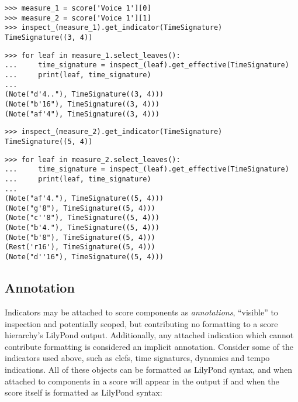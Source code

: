 \begin{abjadbookoutput}
\begin{singlespacing}
\vspace{-0.5\baselineskip}
\begin{lstlisting}
>>> measure_1 = score['Voice 1'][0]
>>> measure_2 = score['Voice 1'][1]
>>> inspect_(measure_1).get_indicator(TimeSignature)
TimeSignature((3, 4))
\end{lstlisting}
\begin{lstlisting}
>>> for leaf in measure_1.select_leaves():
...     time_signature = inspect_(leaf).get_effective(TimeSignature)
...     print(leaf, time_signature)
...
(Note("d'4.."), TimeSignature((3, 4)))
(Note("b'16"), TimeSignature((3, 4)))
(Note("af'4"), TimeSignature((3, 4)))
\end{lstlisting}
\begin{lstlisting}
>>> inspect_(measure_2).get_indicator(TimeSignature)
TimeSignature((5, 4))
\end{lstlisting}
\begin{lstlisting}
>>> for leaf in measure_2.select_leaves():
...     time_signature = inspect_(leaf).get_effective(TimeSignature)
...     print(leaf, time_signature)
...
(Note("af'4."), TimeSignature((5, 4)))
(Note("g'8"), TimeSignature((5, 4)))
(Note("c''8"), TimeSignature((5, 4)))
(Note("b'4."), TimeSignature((5, 4)))
(Note("b'8"), TimeSignature((5, 4)))
(Rest('r16'), TimeSignature((5, 4)))
(Note("d''16"), TimeSignature((5, 4)))
\end{lstlisting}
\end{singlespacing}
\end{abjadbookoutput}

\subsection{Annotation}

Indicators may be attached to score components as \emph{annotations},
\enquote{visible} to inspection and potentially scoped, but contributing no
formatting to a score hierarchy's LilyPond output. Additionally, any attached
indication which cannot contribute formatting is considered an implicit
annotation. Consider some of the indicators used above, such as clefs, time
signatures, dynamics and tempo indications. All of these objects can be
formatted as LilyPond syntax, and when attached to components in a score will
appear in the output if and when the score itself is formatted as LilyPond
syntax:

\begin{comment}
<abjad>
clef = Clef('bass')
print(format(clef, 'lilypond'))
time_signature = TimeSignature((5, 4))
print(format(time_signature, 'lilypond'))
dynamic = Dynamic('p')
print(format(dynamic, 'lilypond'))
tempo = Tempo((1, 4), 88)
print(format(tempo, 'lilypond'))
</abjad>
\end{comment}

